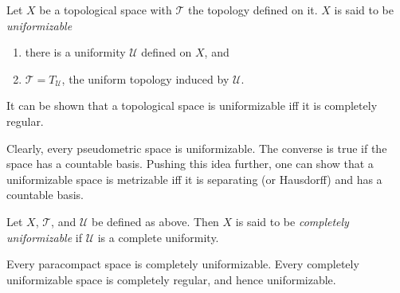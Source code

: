 \documentclass[12pt]{article}
\begin{document}
Let $X$ be a topological space with $\mathcal{T}$ the topology defined on it.  $X$ is said to be \emph{uniformizable}
\begin{enumerate}
\item there is a uniformity $\mathcal{U}$ defined on $X$, and 
\item $\mathcal{T}=T_{\mathcal{U}}$, the uniform topology induced by $\mathcal{U}$.
\end{enumerate}

It can be shown that a topological space is uniformizable iff it is completely regular.

Clearly, every pseudometric space is uniformizable.  The converse is true if the space has a countable basis.  Pushing this idea further, one can show that a uniformizable space is metrizable iff it is separating (or Hausdorff) and has a countable basis.

Let $X$, $\mathcal{T}$, and $\mathcal{U}$ be defined as above.  Then $X$ is said to be \emph{completely uniformizable} if $\mathcal{U}$ is a complete uniformity.

Every paracompact space is completely uniformizable.  Every completely uniformizable space is completely regular, and hence uniformizable.
\end{document}
